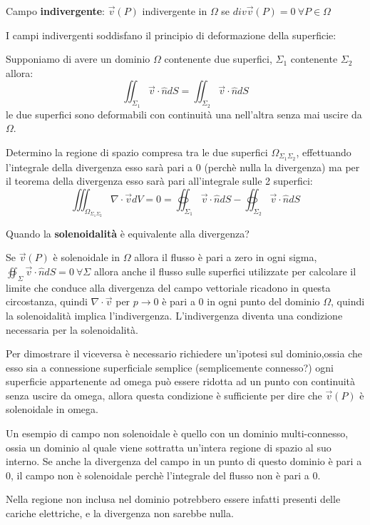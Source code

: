 Campo \textbf{indivergente}: $\vec{v}(P)$ indivergente in $\Omega$ se $div \vec{v}(P) = 0 \ \forall P \in \Omega$

I campi indivergenti soddisfano il principio di deformazione della superficie:

Supponiamo di avere un dominio $\Omega$ contenente due superfici, $\Sigma_1$ contenente $\Sigma_2$
allora:
$$
\iint_{\Sigma_1} \vec{v}\cdot\hat{n}dS = \iint_{\Sigma_2}\vec{v}\cdot\hat{n}dS 
$$
le due superfici sono deformabili con continuità una nell'altra senza mai uscire da $\Omega$.

Determino la regione di spazio compresa tra le due superfici $\Omega_{\Sigma_1\Sigma_2}$,
effettuando l'integrale della divergenza esso sarà pari a 0 (perchè nulla la divergenza) ma per 
il teorema della divergenza esso sarà pari all'integrale sulle 2 superfici:
$$
\iiint_{\Omega_{\Sigma_1\Sigma_2}} \nabla\cdot\vec{v}dV = 0 = \oiint_{\Sigma_1}\vec{v}\cdot\hat{n}dS - \oiint_{\Sigma_2}\vec{v}\cdot\hat{n}dS
$$

Quando la \textbf{solenoidalità} è equivalente alla divergenza?

Se $\vec{v}(P)$ è solenoidale in $\Omega$ allora il flusso è pari a zero in ogni sigma,$\oiint_\Sigma \vec{v}\cdot\hat{n}dS = 0 \ \forall \Sigma $ allora
anche il flusso sulle superfici utilizzate per calcolare il limite che conduce alla divergenza del campo vettoriale ricadono in questa circostanza, quindi $\nabla\cdot\vec{v}$ per $p\to 0$ è pari a 0 in ogni punto
del dominio $\Omega$, quindi la solenoidalità implica l'indivergenza.
L'indivergenza diventa una condizione necessaria per la solenoidalità.

Per dimostrare il viceversa è necessario richiedere un'ipotesi sul dominio,ossia che esso sia
a connessione superficiale semplice (semplicemente connesso?)
ogni superficie appartenente ad omega può essere ridotta ad un punto con continuità senza uscire da omega,
allora questa condizione è sufficiente per dire che $\vec{v}(P)$ è solenoidale in omega.

Un esempio di campo non solenoidale è quello con un dominio multi-connesso, ossia un dominio
al quale viene sottratta un'intera regione di spazio al suo interno.
Se anche la divergenza del campo in un punto di questo dominio è pari a 0, il campo non è 
solenoidale perchè l'integrale del flusso non è pari a 0.

Nella regione non inclusa nel dominio potrebbero essere infatti presenti delle cariche
elettriche, e la divergenza non sarebbe nulla.
